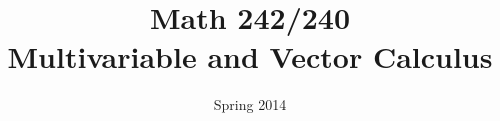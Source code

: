 \documentclass{beamer}
\title[Multivariable Calculus]{Math 242/240 \\ Multivariable and Vector Calculus}
\date{Spring 2014}
\begin{document}
\begin{frame}
  \titlepage
\end{frame}



\begin{small}

%
%
%
%
%
%
%
%
%
%
%
%


\end{small}
\end{document}
